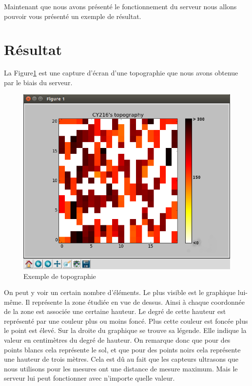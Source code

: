 \documentclass[a4paper,10pt]{report}
\begin{document}
      Maintenant que nous avons présenté le fonctionnement du serveur nous 
allons pouvoir vous présenté un exemple de résultat.

    \section{Résultat}
      La Figure\ref{exemple_topo} est une capture d'écran d'une topographie que 
nous avons obtenue par le biais du serveur.

	\begin{figure}[htbp]
	  \centering
	  \includegraphics[scale=0.4]{img/topography_example.png}
	  \caption{Exemple de topographie}
	  \label{exemple_topo}
	\end{figure}
	
      On peut y voir un certain nombre d'éléments. Le plus visible est le 
graphique lui-même. Il représente la zone étudiée en vue de dessus. Ainsi à 
chaque coordonnée de la zone est associée une certaine hauteur. Le degré de 
cette hauteur est représenté par une couleur plus ou moins foncé. Plus cette 
couleur est foncée plus le point est élevé. Sur la droite du graphique se 
trouve sa légende. Elle indique la valeur en centimètres du degré de hauteur. 
On remarque donc que pour des points blancs cela représente le sol, et que pour 
des points noirs cela représente une hauteur de trois mètres. Cela est dû au 
fait que les capteurs ultrasons que nous utilisons pour les mesures ont une 
distance de mesure maximum. Mais le serveur lui peut fonctionner avec n'importe 
quelle valeur.
\end{document}
